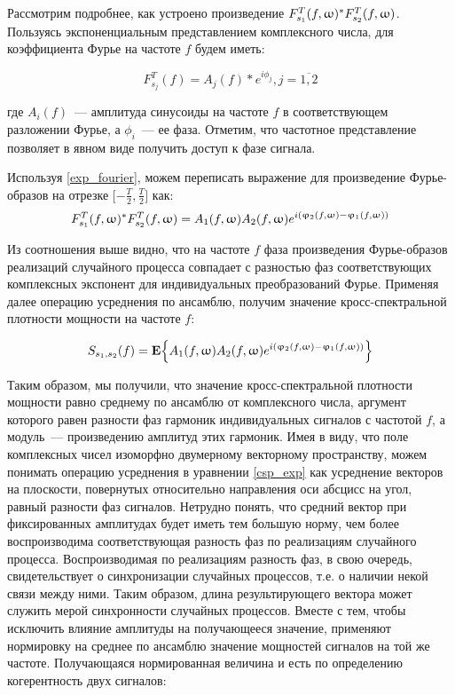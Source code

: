Рассмотрим подробнее, как устроено произведение
$F_{s_1}^T(f,\upomega)^* F_{s_2}^T(f,\upomega)$.
Пользуясь экспоненциальным представлением комплексного числа, для коэффициента Фурье на частоте $f$
будем иметь:

\begin{equation}
    F_{s_j}^T(f) = A_j(f) * e^{i\phi_j}, j=\overline{1,2}
    \label{exp_fourier}
\end{equation}

где $A_i(f)$~--- амплитуда синусоиды на частоте $f$ в соответствующем
разложении Фурье, а $\phi_i$~--- ее фаза.  Отметим, что частотное представление
позволяет в явном виде получить доступ к фазе сигнала.

Используя \ref{exp_fourier}, можем переписать выражение для произведение Фурье-образов
на отрезке $\Big[{-\frac{T}{2}}, \frac{T}{2}\Big]$ как:
\begin{equation}
    F_{s_1}^T(f,\upomega)^* F_{s_2}^T(f,\upomega) =
    A_1(f,\upomega)A_2(f,\upomega) e^{i(\upvarphi_2(f,\upomega) - \upvarphi_1(f,\upomega))}
\end{equation}

Из соотношения выше видно, что на частоте $f$ фаза произведения Фурье-образов
реализаций случайного процесса совпадает с разностью фаз соответствующих
комплексных экспонент для индивидуальных преобразований Фурье. Применяя далее
операцию усреднения по ансамблю, получим значение кросс-спектральной плотности
мощности на частоте $f$:

\begin{equation}
    S_{s_1, s_2}(f) = \mathbf{E}\Big\{A_1(f,\upomega)A_2(f,\upomega) e^{i(\upvarphi_2(f,\upomega) - \upvarphi_1(f,\upomega))}\Big\}
    \label{csp_exp}
\end{equation}

Таким образом, мы получили, что значение кросс-спектральной плотности мощности
равно среднему по ансамблю от комплексного числа, аргумент которого равен
разности фаз гармоник индивидуальных сигналов с частотой $f$, а  модуль~---
произведению амплитуд этих гармоник.  Имея в виду, что поле комплексных чисел
изоморфно двумерному векторному пространству, можем понимать операцию
усреднения в уравнении \ref{csp_exp} как усреднение векторов на плоскости,
повернутых относительно направления оси абсцисс на угол, равный разности фаз
сигналов.  Нетрудно понять, что средний вектор при фиксированных амплитудах
будет иметь тем большую норму, чем более воспроизводима соответствующая
разность фаз по реализациям случайного процесса.  Воспроизводимая по
реализациям разность фаз, в свою очередь, свидетельствует о синхронизации
случайных процессов, т.е. о наличии некой связи между ними.  Таким
образом, длина результирующего вектора может служить мерой синхронности
случайных процессов.  Вместе с тем, чтобы исключить влияние амплитуды на
получающееся значение, применяют нормировку на среднее по ансамблю значение
мощностей сигналов на той же частоте.  Получающаяся нормированная величина и
есть по определению когерентность двух сигналов:

